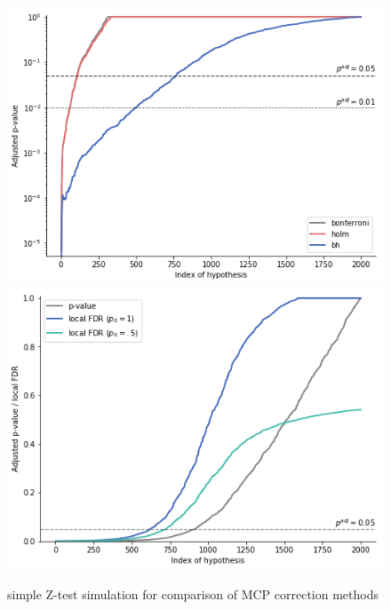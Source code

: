 \documentclass[a4paper, 11pt, oneside]{article}
\begin{document}
\begin{figure}[ht]
\centering
\includegraphics[scale=0.4]{adj_pval_report} 
\includegraphics[scale=0.4]{pval-lfdr_report}
\caption{simple Z-test simulation for comparison of MCP correction methods}
\end{figure}
\end{document}
